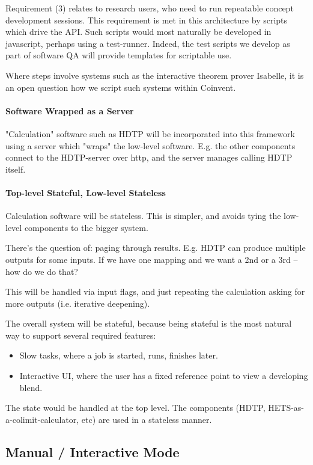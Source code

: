 \documentclass[10pt]{article}
\begin{document}
Requirement (3) relates to research users, who need to run repeatable concept development sessions. This requirement is met in this architecture by scripts which drive the API. Such scripts would most naturally be developed in javascript, perhaps using a test-runner. Indeed, the test scripts we develop as part of software QA will provide templates for scriptable use.

Where steps involve systems such as the interactive theorem prover Isabelle, it is an open question how we script such systems within Coinvent.

\paragraph{Software Wrapped as a Server}

"Calculation" software such as HDTP will be incorporated into this framework using a server which "wraps" the low-level software. E.g. the other components connect to the HDTP-server over http, and the server manages calling HDTP itself.


\paragraph{Top-level Stateful, Low-level Stateless}

Calculation software will be stateless. This is simpler, and avoids tying the
low-level components to the bigger system.

There's the question of: paging through results.
E.g. HDTP can produce multiple outputs for some inputs.
If we have one mapping and we want a 2nd or a 3rd -- how do we do that?   

This will be handled via input flags, and just repeating
the calculation asking for more outputs (i.e. iterative deepening).

The overall system will be stateful, because being stateful is the
most natural way to support several required features:
\begin{itemize}
\item Slow tasks, where a job is started, runs, finishes later.
\item Interactive UI, where the user has a fixed reference point to view
a developing blend.
\end{itemize}
The state would be handled at the top level. The components
(HDTP, HETS-as-a-colimit-calculator, etc) are used in a stateless manner.


\subsection{Manual / Interactive Mode}
\end{document}
